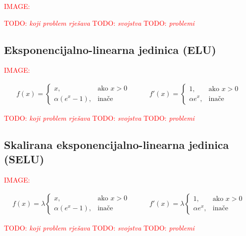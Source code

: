 \documentclass[times, utf8, diplomski]{fer}
\def\TODO#1{\noindent\textcolor{red}{TODO: \textit{#1}}\newline}
\def\todo#1{\TODO{#1}}
\def\todoimg#1{\begin{center} \textcolor{red}{IMAGE: \textit{#1}} \end{center}}
\begin{document}
\todoimg{}

\todo{koji problem rješava}
\todo{svojstva}
\todo{problemi}

\subsection*{Eksponencijalno-linearna jedinica (ELU)}

\todoimg{}

\begin{equation}
\begin{split}
f(x) = 
\begin{cases}
x,					& \text{ako } x > 0 \\
\alpha (e^x - 1),	&  \text{inače}
\end{cases}
\end{split}
\qquad
\begin{split}
f'(x) = 
\begin{cases}
1,	 		& \text{ako } x > 0 \\
\alpha e^x,	& \text{inače}
\end{cases}
\end{split}
\end{equation}

\todo{koji problem rješava}
\todo{svojstva}
\todo{problemi}

\subsection*{Skalirana eksponencijalno-linearna jedinica (SELU)}

\todoimg{}

\begin{equation}
\begin{split}
f(x) = \lambda
\begin{cases}
x,					& \text{ako } x > 0 \\
\alpha (e^x - 1),	&  \text{inače}
\end{cases}
\end{split}
\qquad
\begin{split}
f'(x) = \lambda
\begin{cases}
1,	 		& \text{ako } x > 0 \\
\alpha e^x,	& \text{inače}
\end{cases}
\end{split}
\end{equation}

\todo{koji problem rješava}
\todo{svojstva}
\todo{problemi}
\end{document}
